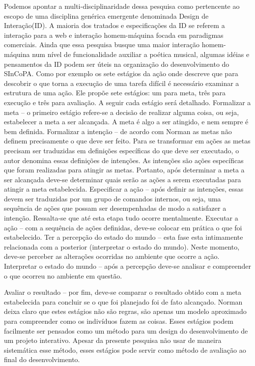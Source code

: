 \documentclass{ppgmus}
\begin{document}
Podemos apontar a multi-disciplinaridade dessa pesquisa como pertencente 
ao escopo de uma disciplina genérica emergente denominada Design de Interação(ID).
A maioria dos tratados e especificações da ID se referem a interação para a web
e interação homem-máquina focada em paradigmas comerciais. Ainda que essa pesquisa busque
uma maior interação homem-máquina num nível de funcionalidade auxiliar a poética musical, algumas idéias e 
pensamentos da ID podem ser úteis na organização do desenvolvimento do SInCoPA. 
Como por exemplo os sete estágios da ação \cite{norman06:design} onde descreve que para 
descobrir o que torna a
execução de uma tarefa difícil é necessário examinar a
estrutura de uma ação. Ele propõe sete estágios: um para
meta, três para execução e três para avaliação. A seguir cada
estágio será detalhado.
Formalizar a meta – o primeiro estágio refere-se a decisão de
realizar alguma coisa, ou seja, estabelecer a meta a ser
alcançada. A meta é algo a ser atingido, e nem sempre é bem
definida.
Formalizar a intenção – de acordo com Norman as
metas não definem precisamente o que deve ser feito. Para
se transformar em ações as metas precisam ser traduzidas
em definições específicas do que deve ser executado, o autor
denomina essas definições de intenções. As intenções são
ações específicas que foram realizadas para atingir as metas.
Portanto, após determinar a meta a ser alcançada deve-se
determinar quais serão as ações a serem executadas para
atingir a meta estabelecida.
Especificar a ação – após definir as intenções, essas devem
ser traduzidas por um grupo de comandos internos, ou seja,
uma sequência de ações que possam ser desempenhadas de
modo a satisfazer a intenção. Ressalta-se que até esta etapa
tudo ocorre mentalmente.
Executar a ação – com a sequência de ações definidas,
deve-se colocar em prática o que foi estabelecido.
Ter a percepção do estado do mundo – esta fase esta
intimamente relacionada com a posterior (interpretar o estado
do mundo). Neste momento, deve-se perceber as alterações
ocorridas no ambiente que ocorre a ação.
Interpretar o estado do mundo – após a percepção deve-se
analisar e compreender o que ocorreu no ambiente em
questão.

Avaliar o resultado – por fim, deve-se comparar o resultado
obtido com a meta estabelecida para concluir se o que foi
planejado foi de fato alcançado.
Norman deixa claro que estes estágios não são regras,
são apenas um modelo aproximado para compreender como
os indivíduos fazem as coisas. Esses estágios podem facilmente
ser pensados como um método para um design do desenvolvimento 
de um projeto interativo. Apesar da presente pesquisa não usar de 
maneira sistemática esse método, esses estágios pode servir como
método de avaliação ao final do desenvolvimento.
\end{document}
